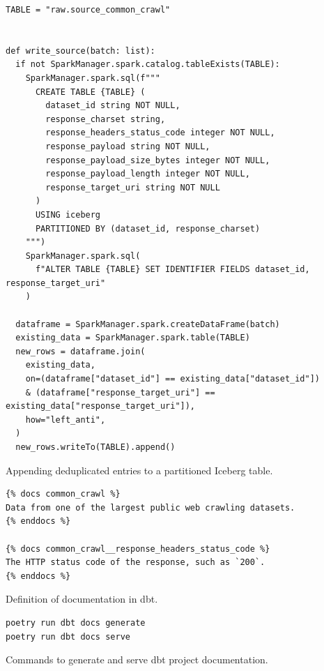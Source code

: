 \begin{listing}[H]
\begin{verbatim}
TABLE = "raw.source_common_crawl"


def write_source(batch: list):
  if not SparkManager.spark.catalog.tableExists(TABLE):
    SparkManager.spark.sql(f"""
      CREATE TABLE {TABLE} (
        dataset_id string NOT NULL,
        response_charset string,
        response_headers_status_code integer NOT NULL,
        response_payload string NOT NULL,
        response_payload_size_bytes integer NOT NULL,
        response_payload_length integer NOT NULL,
        response_target_uri string NOT NULL
      )
      USING iceberg
      PARTITIONED BY (dataset_id, response_charset)
    """)
    SparkManager.spark.sql(
      f"ALTER TABLE {TABLE} SET IDENTIFIER FIELDS dataset_id, response_target_uri"
    )

  dataframe = SparkManager.spark.createDataFrame(batch)
  existing_data = SparkManager.spark.table(TABLE)
  new_rows = dataframe.join(
    existing_data,
    on=(dataframe["dataset_id"] == existing_data["dataset_id"])
    & (dataframe["response_target_uri"] == existing_data["response_target_uri"]),
    how="left_anti",
  )
  new_rows.writeTo(TABLE).append()
\end{verbatim}
\caption{Appending deduplicated entries to a partitioned Iceberg table.}
\label{lst:dagster-source-common-crawl-write-deduplicated}
\end{listing}

\begin{listing}[H]
\begin{verbatim}
{% docs common_crawl %}
Data from one of the largest public web crawling datasets.
{% enddocs %}

{% docs common_crawl__response_headers_status_code %}
The HTTP status code of the response, such as `200`.
{% enddocs %}
\end{verbatim}
\caption{Definition of documentation in dbt.}
\label{lst:appendix-listings-dbt-doc}
\end{listing}

\begin{listing}[H]
\begin{verbatim}
poetry run dbt docs generate
poetry run dbt docs serve
\end{verbatim}
\caption{Commands to generate and serve dbt project documentation.}
\label{lst:implementation-pipeline-transformation-dbt-docs}
\end{listing}

